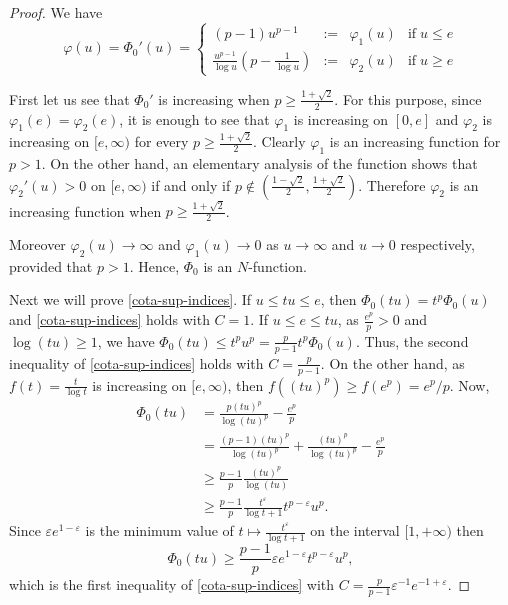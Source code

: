 \documentclass[twoside]{article}
\theoremstyle{remark}
\renewcommand{\leq}{\leqslant}
\renewcommand{\geq}{\geqslant}
\begin{document}
\begin{proof}
We have
\[\varphi(u)=\Phi_0'(u)=\left\{
\begin{array}{cccc}
(p-1)u^{p-1}&:=&\varphi_1(u)& \mbox{if}\;u\leq e
\\
\frac{u^{p-1}}{\log u}(p-\frac{1}{\log u})&:=&\varphi_2(u)&\mbox{if}\; u\geq e
\end{array}
\right.
\]

First let us see that $\Phi_0'$ is increasing when $p\geq \frac{1+\sqrt {2}}{2}$.
For this purpose, since $\varphi_1(e)=\varphi_2(e)$, it is enough to see that $\varphi_1$ is increasing  on $[0,e]$ and $\varphi_2$ is increasing on
$[e,\infty)$ for every $p\geq \frac{1+\sqrt {2}}{2}$. Clearly
$\varphi_1$ is an increasing function for $p>1$.  On the other hand, an elementary analysis of the function shows that
$\varphi_2'(u)>0$ on $[e,\infty)$ if and only if
 $p \notin(\frac{1-\sqrt2}{2},\frac{1+\sqrt2}{2})$.  Therefore $\varphi_2$ is an increasing function when $p\geq \frac{1+\sqrt2}{2}$.

Moreover $\varphi_2(u)\to \infty$ and  $\varphi_1(u)\to 0$  as $u \to  \infty$ and $u\to 0$  respectively, provided that $p>1$. Hence, $\Phi_0$ is an $N$-function.



Next we will prove \eqref{cota-sup-indices}. If $u\leq tu\leq e$, then $\Phi_0(tu)=t^p\Phi_0(u)$ and \eqref{cota-sup-indices} holds with $C=1$. If $u\leq e\leq tu$, as $\frac{e^p}{p}>0$  and $\log(tu)\geq 1$, we have
$\Phi_0(tu)\leq t^pu^p= \frac{p}{p-1}t^p\Phi_0(u)$. Thus, the second inequality of  \eqref{cota-sup-indices} holds with $C=\frac{p}{p-1}$. On the other hand, as $f(t)=\frac{t}{\log t}$ is increasing on $[e,\infty)$, then $f((tu)^p)\geq  f(e^p)=e^p/p$.
Now,
\[
\begin{split}
\Phi_0(tu)&=\frac{p(tu)^p}{\log (tu)^p}-\frac{e^p}{p}\\
&= \frac{(p-1)(tu)^p}{\log(tu)^p}+\frac{(tu)^p}{\log (tu)^p}-\frac{e^p}{p}
\\
&\geq \frac{p-1}{p}\frac{(tu)^p}{\log(tu)}\\
&\geq
\frac{p-1}{p}\frac{t^{\varepsilon}}{\log t+1}t^{p-\varepsilon}u^p.
\end{split}
\]
Since $\varepsilon e^{1-\varepsilon}$ is the minimum value of $t\mapsto\frac{t^{\varepsilon}}{\log t+1}$  on the interval $[1,+\infty)$ then
\[
\Phi_0(tu)\geq \frac{p-1}{p}\varepsilon e^{1-\varepsilon}t^{p-\varepsilon}u^p,
\]
which is the first inequality of \eqref{cota-sup-indices} with $C=\frac{p}{p-1}\varepsilon^{-1} e^{-1+\varepsilon}$.



\end{proof}
\end{document}
